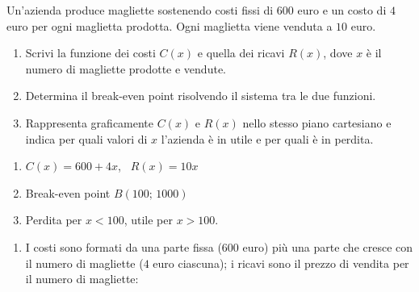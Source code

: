 
\begin{question}[ID=4.1, subtitle={Break-even di una produzione di magliette}, difficulty=media, tags={sistemi, break-even, grafici}]
Un'azienda produce magliette sostenendo costi fissi di $600$ euro e un costo di $4$ euro per ogni maglietta prodotta. Ogni maglietta viene venduta a $10$ euro.
\begin{enumerate}[label=\alph*),leftmargin=1.8cm]
    \item Scrivi la funzione dei costi $C(x)$ e quella dei ricavi $R(x)$, dove $x$ è il numero di magliette prodotte e vendute.
    \item Determina il break-even point risolvendo il sistema tra le due funzioni.
    \item Rappresenta graficamente $C(x)$ e $R(x)$ nello stesso piano cartesiano e indica per quali valori di $x$ l'azienda è in utile e per quali è in perdita.
\end{enumerate}
\begin{solution}
\begin{enumerate}[label=\alph*),leftmargin=1.8cm]
    \item $C(x)=600+4x$, \ $R(x)=10x$
    \item Break-even point $B(100;\,1000)$
    \item Perdita per $x<100$, utile per $x>100$.
\begin{center}
\end{center}
\end{enumerate}
\end{solution}
\begin{explanation}
\begin{enumerate}[label=\alph*),leftmargin=1.8cm]
    \item I costi sono formati da una parte fissa ($600$ euro) più una parte che cresce con il numero di magliette ($4$ euro ciascuna); i ricavi sono il prezzo di vendita per il numero di magliette:

\end{enumerate}
\end{explanation}
\end{question}
